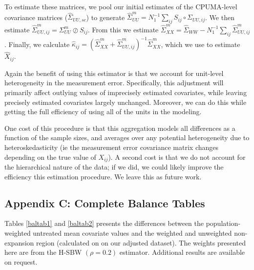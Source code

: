 \documentclass[12pt]{article}
\begin{document}
To estimate these matrices, we pool our initial estimates of the CPUMA-level covariance matrices ($\hat{\Sigma}_{UU, sc}$) to generate $\hat{\Sigma}_{UU}^m = N_1^{-1}\sum_{ij} S_{ij} \circ \Sigma_{UU, ij}$. We then estimate $\hat{\Sigma}_{UU, ij}^m = \Sigma_{UU}^m \oslash S_{ij}$. From this we estimate $\hat{\Sigma}^m_{XX} = \hat{\Sigma}_{WW} - N_1^{-1}\sum_{ij}\hat{\Sigma}^m_{UU, ij}$. Finally, we calculate $\hat{\kappa}_{ij} = (\hat{\Sigma}^m_{XX} + \hat{\Sigma}^m_{UU, ij})^{-1}\hat{\Sigma}^m_{XX}$, which we use to estimate $\hat{X}_{ij}$. 

Again the benefit of using this estimator is that we account for unit-level heterogeneity in the measurement error. Specifically, this adjustment will primarily affect outlying values of imprecisely estimated covariates, while leaving precisely estimated covariates largely unchanged. Moreover, we can do this while getting the full efficiency of using all of the units in the modeling. 

One cost of this procedure is that this aggregation models all differences as a function of the sample sizes, and averages over any potential heterogeneity due to heteroskedasticity (ie the measurement error covariance matrix changes depending on the true value of $X_{ij}$). A second cost is that we do not account for the hierarchical nature of the data; if we did, we could likely improve the efficiency this estimation procedure. We leave this as future work.

\subsection{Appendix C: Complete Balance Tables}

Tables \ref{baltab1} and \ref{baltab2} presents the differences between the population-weighted untreated mean covariate values and the weighted and unweighted non-expansion region (calculated on on our adjusted dataset). The weights presented here are from the H-SBW $(\rho = 0.2)$ estimator. Additional results are available on request.
\end{document}
